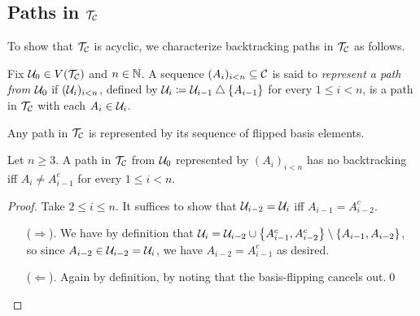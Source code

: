 \documentclass{amsart}
\begin{document}
    \subsection{Paths in $\mathcal{T}_{\mathcal{C}}$}

    To show that $\mathcal{T}_{\mathcal{C}}$ is acyclic, we characterize backtracking paths in $\mathcal{T}_{\mathcal{C}}$ as follows.

    \begin{definition}
        Fix $\mathcal{U}_0\in V(\mathcal{T}_{\mathcal{C}})$ and $n\in\mathbb{N}$. A sequence $(A_i)_{i<n}\subseteq\mathcal{C}$ is said to \textit{represent a path from $\mathcal{U}_0$} if $(\mathcal{U}_i)_{i<n}$, defined by $\mathcal{U}_i\coloneqq\mathcal{U}_{i-1}\bigtriangleup\left\{A_{i-1}\right\}$ for every $1\leq i<n$, is a path in $\mathcal{T}_{\mathcal{C}}$ with each $A_i\in\mathcal{U}_i$.
    \end{definition}

    \begin{remark}
        Any path in $\mathcal{T}_{\mathcal{C}}$ is represented by its sequence of flipped basis elements.
    \end{remark}

    \begin{lemma}\label{no-backtrack}
        Let $n\geq3$. A path in $\mathcal{T}_{\mathcal{C}}$ from $\mathcal{U}_0$ represented by $(A_i)_{i<n}$ has no backtracking iff $A_i\neq A_{i-1}^c$ for every $1\leq i<n$.
    \end{lemma}
    \begin{proof}
        Take $2\leq i\leq n$. It suffices to show that $\mathcal{U}_{i-2}=\mathcal{U}_i$ iff $A_{i-1}=A_{i-2}^c$.
        \begin{itemize}
            \item[($\Rightarrow$).] We have by definition that $\mathcal{U}_i=\mathcal{U}_{i-2}\cup\left\{A_{i-1}^c,A_{i-2}^c\right\}\setminus\left\{A_{i-1},A_{i-2}\right\}$, so since $A_{i-2}\in\mathcal{U}_{i-2}=\mathcal{U}_i$, we have $A_{i-2}=A_{i-1}^c$ as desired.
            \item[($\Leftarrow$).] Again by definition, by noting that the basis-flipping cancels out.\qed
        \end{itemize}
    \end{proof}
\end{document}
